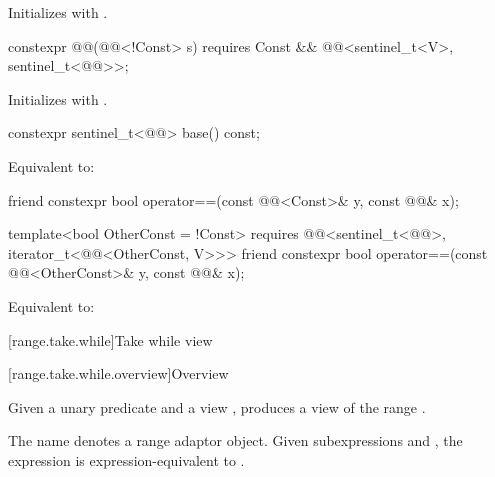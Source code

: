 \begin{itemdescr}
\pnum
\effects
Initializes  with .
\end{itemdescr}

%
\begin{itemdecl}
constexpr @@(@@<!Const> s)
  requires Const && @@<sentinel_t<V>, sentinel_t<@@>>;
\end{itemdecl}

\begin{itemdescr}
\pnum
\effects
Initializes  with .
\end{itemdescr}

%
\begin{itemdecl}
constexpr sentinel_t<@@> base() const;
\end{itemdecl}

\begin{itemdescr}
\pnum
\effects
Equivalent to: 
\end{itemdescr}

%
\begin{itemdecl}
friend constexpr bool operator==(const @@<Const>& y, const @@& x);

template<bool OtherConst = !Const>
  requires @@<sentinel_t<@@>, iterator_t<@@<OtherConst, V>>>
friend constexpr bool operator==(const @@<OtherConst>& y, const @@& x);
\end{itemdecl}

\begin{itemdescr}
\pnum
\effects
Equivalent to:
\end{itemdescr}

[range.take.while]{Take while view}

[range.take.while.overview]{Overview}

\pnum
Given a unary predicate  and a view ,
 produces a view
of the range .

%
\pnum
{}%
The name  denotes
a range adaptor object.
Given subexpressions  and ,
the expression 
is expression-equivalent to .

